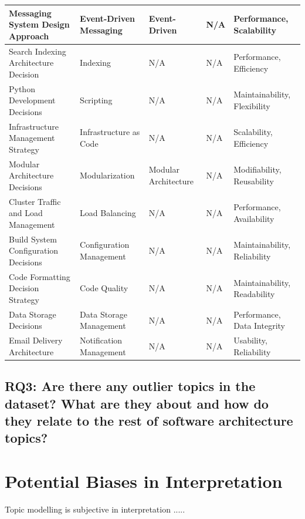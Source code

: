 {\begin{longtable}{|p{3.8cm}|p{3cm}|p{2.2cm}|p{2.1cm}|p{2.8cm}|}
        \hline
        Messaging System Design Approach & Event-Driven Messaging & Event-Driven & N/A & Performance, Scalability \\
        \hline
        Search Indexing Architecture Decision & Indexing & N/A & N/A & Performance, Efficiency \\
        \hline
        Python Development Decisions & Scripting & N/A & N/A & Maintainability, Flexibility \\
        \hline
        Infrastructure Management Strategy & Infrastructure as Code & N/A & N/A & Scalability, Efficiency \\
        \hline
        Modular Architecture Decisions & Modularization & Modular Architecture & N/A & Modifiability, Reusability \\
        \hline
        Cluster Traffic and Load Management & Load Balancing & N/A & N/A & Performance, Availability \\
        \hline
        Build System Configuration Decisions & Configuration Management & N/A & N/A & Maintainability, Reliability \\
        \hline
        Code Formatting Decision Strategy & Code Quality & N/A & N/A & Maintainability, Readability \\
        \hline
        Data Storage Decisions & Data Storage Management & N/A & N/A & Performance, Data Integrity \\
        \hline
        Email Delivery Architecture & Notification Management & N/A & N/A & Usability, Reliability \\
        \hline
        \end{longtable}
    }
        

        
        \subsection{RQ3: Are there any outlier topics in the dataset? What are they about and how do they relate to the rest of software architecture topics?}
        
        


        
    \section{Potential Biases in Interpretation}
    Topic modelling is subjective in interpretation ..... 